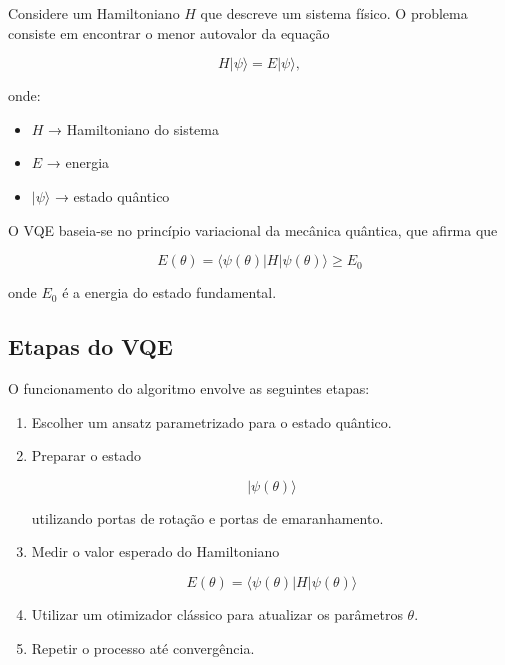 \documentclass[a4paper,12pt]{article}
\begin{document}
Considere um \colorbox{blue!30}{Hamiltoniano $H$ que descreve um sistema físico}. O problema 
consiste em \colorbox{red!30}{encontrar o menor autovalor da equação}

\begin{equation}
H|\psi\rangle = E|\psi\rangle,
\end{equation}

onde:

\begin{itemize}
\item $H$ → Hamiltoniano do sistema
\item $E$ → energia
\item $|\psi \rangle$ → estado quântico
\end{itemize}

O \colorbox{green!30}{VQE} baseia-se no \colorbox{green!30}{princípio variacional da mecânica quântica}, que afirma que

\begin{equation}
E(\theta) = \langle \psi(\theta)|H|\psi(\theta)\rangle \geq E_0
\end{equation}

onde \colorbox{green!30}{$E_0$ é a energia do estado fundamental}.

\subsection{Etapas do VQE}

O funcionamento do algoritmo envolve as seguintes etapas:

\begin{enumerate}

\item Escolher um ansatz parametrizado para o estado quântico.

\item Preparar o estado

\begin{equation}
|\psi(\theta)\rangle
\end{equation}

utilizando portas de rotação e portas de emaranhamento.

\item Medir o valor esperado do Hamiltoniano

\begin{equation}
E(\theta)=\langle \psi(\theta)|H|\psi(\theta)\rangle
\end{equation}

\item Utilizar um otimizador clássico para atualizar os parâmetros $\theta$.

\item Repetir o processo até convergência.

\end{enumerate}
\end{document}

